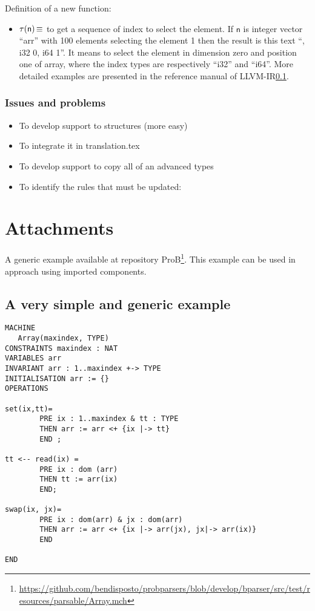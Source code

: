 \documentclass[10pt,a4paper]{article}
\DeclareMathOperator{\isdef}{\equiv}
\newcommand{\B}[1]{\textsf{#1}}
\newcommand{\stateindex}[0]{\ensuremath{\sf\tau}}
\begin{document}
Definition of a new function:

\begin{itemize}
\item $\stateindex(\B{n}) \isdef$ to get a sequence of index to select the 
element. If $\B{n} $ is integer vector ``arr'' with 100 elements selecting the 
element 1 then the result is this text ``, i32 0, i64 1''. It means to select 
the element in dimension zero and position one of array, where the index types are 
respectively ``i32'' and ``i64''. More detailed examples are presented in the reference 
manual of LLVM-IR\ref{}.

\end{itemize}

\subsubsection{Issues and problems}
\begin{itemize}
	\item To develop support to structures (more easy)
	\item To integrate it in translation.tex
	\item To develop support to copy all  of an advanced types
	\item To identify the rules that must be updated:
	

\end{itemize}


\section*{Attachments}




A generic example available at repository ProB\footnote{
\url{https://github.com/bendisposto/probparsers/blob/develop/bparser/src/test/resources/parsable/Array.mch}}. 
This example can be used in approach using imported components.

\subsection{A very simple and generic example}


\begin{verbatim}
MACHINE
   Array(maxindex, TYPE)
CONSTRAINTS maxindex : NAT
VARIABLES arr
INVARIANT arr : 1..maxindex +-> TYPE
INITIALISATION arr := {}
OPERATIONS 

set(ix,tt)=
        PRE ix : 1..maxindex & tt : TYPE
        THEN arr := arr <+ {ix |-> tt}
        END ;

tt <-- read(ix) =
        PRE ix : dom (arr)
        THEN tt := arr(ix)
        END;

swap(ix, jx)=
        PRE ix : dom(arr) & jx : dom(arr)
        THEN arr := arr <+ {ix |-> arr(jx), jx|-> arr(ix)}
        END

END
\end{verbatim}
\end{document}
